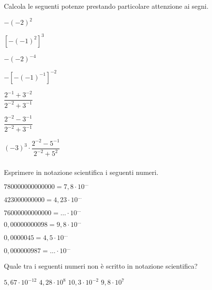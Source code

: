\begin{esercizio}
 \label{ese:3.60}
Calcola le seguenti potenze prestando particolare attenzione ai segni.
\begin{multicols}{3}
\begin{enumeratea}
 \spazielenx
 \item \(-(-2)^2\)
 \item \([-(-1)^{2}]^3\)
 \item \(-(-2)^{-4}\)
 \item \(-[-(-1)^{-1}]^{-2}\)
 \item \(\dfrac{2^{-1}+3^{-2}}{2^{-2}+3^{-1}}\)
 \item \(\dfrac{2^{-2}-3^{-1}}{2^{-2}+3^{-1}}\)
 \item \((-3)^3\cdot\dfrac{2^{-2}-5^{-1}}{2^{-2}+5^2}\)
\end{enumeratea}
\end{multicols}
\end{esercizio}

\subsubsection*{}

\begin{esercizio}
 \label{ese:3.61}
Esprimere in notazione scientifica i seguenti numeri.
\begin{multicols}{2}
\begin{enumeratea}
\item \(780000000000000=7,8\cdot10^{\ldots}\)
\item \(423000000000=4,23\cdot10^{\ldots}\)
\item \(76000000000000= \ldots \cdot 10^{\ldots}\)
\item \(0,00000000098=9,8\cdot10^{\ldots}\)
\item \(0,0000045=4,5\cdot10^{\ldots}\)
\item \(0,000000987= \ldots \cdot 10^{\ldots}\)
\end{enumeratea}
\end{multicols}
\end{esercizio}

\begin{esercizio}
 \label{ese:3.62}
Quale tra i seguenti numeri non è scritto in notazione scientifica?

\boxA\quad\(5,67\cdot 10^{-12}\)\qquad
\boxB\quad\(4,28\cdot 10^8\)\qquad
\boxC\quad\(10,3\cdot 10^{-2}\)\qquad
\boxD\quad\(9,8\cdot 10^7\)\qquad
\end{esercizio}

